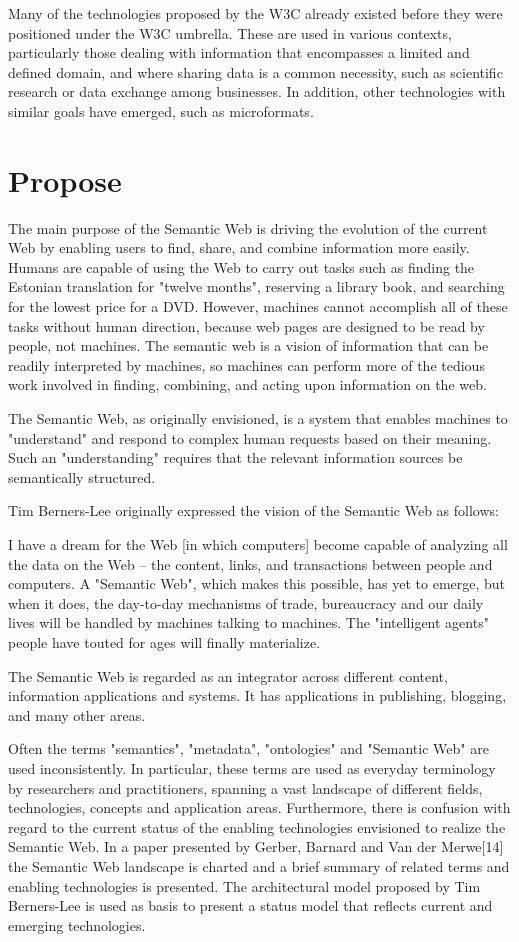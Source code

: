 Many of the technologies proposed by the W3C already existed before they were positioned under the W3C umbrella. These are used in various contexts, particularly those dealing with information that encompasses a limited and defined domain, and where sharing data is a common necessity, such as scientific research or data exchange among businesses. In addition, other technologies with similar goals have emerged, such as microformats.


\section{Propose}

The main purpose of the Semantic Web is driving the evolution of the current Web by enabling users to find, share, and combine information more easily. Humans are capable of using the Web to carry out tasks such as finding the Estonian translation for "twelve months", reserving a library book, and searching for the lowest price for a DVD. However, machines cannot accomplish all of these tasks without human direction, because web pages are designed to be read by people, not machines. The semantic web is a vision of information that can be readily interpreted by machines, so machines can perform more of the tedious work involved in finding, combining, and acting upon information on the web.

The Semantic Web, as originally envisioned, is a system that enables machines to "understand" and respond to complex human requests based on their meaning. Such an "understanding" requires that the relevant information sources be semantically structured.

Tim Berners-Lee originally expressed the vision of the Semantic Web as follows:

I have a dream for the Web [in which computers] become capable of analyzing all the data on the Web – the content, links, and transactions between people and computers. A "Semantic Web", which makes this possible, has yet to emerge, but when it does, the day-to-day mechanisms of trade, bureaucracy and our daily lives will be handled by machines talking to machines. The "intelligent agents" people have touted for ages will finally materialize.

The Semantic Web is regarded as an integrator across different content, information applications and systems. It has applications in publishing, blogging, and many other areas.


Often the terms "semantics", "metadata", "ontologies" and "Semantic Web" are used inconsistently. In particular, these terms are used as everyday terminology by researchers and practitioners, spanning a vast landscape of different fields, technologies, concepts and application areas. Furthermore, there is confusion with regard to the current status of the enabling technologies envisioned to realize the Semantic Web. In a paper presented by Gerber, Barnard and Van der Merwe[14] the Semantic Web landscape is charted and a brief summary of related terms and enabling technologies is presented. The architectural model proposed by Tim Berners-Lee is used as basis to present a status model that reflects current and emerging technologies.

